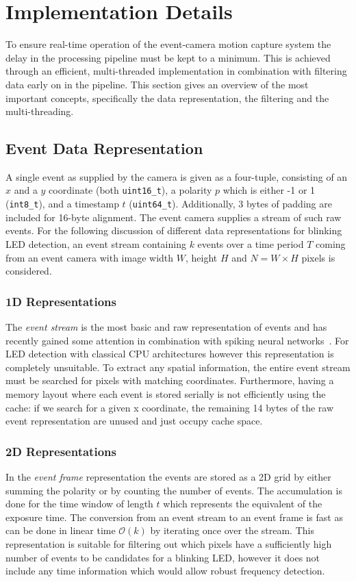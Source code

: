 \section{Implementation Details}
\label{sec:implementation_details}
To ensure real-time operation of the event-camera motion capture system the delay in the processing pipeline must be kept to a minimum. This is achieved through an efficient, multi-threaded implementation in combination with filtering data early on in the pipeline. This section gives an overview of the most important concepts, specifically the data representation, the filtering and the multi-threading.

\subsection{Event Data Representation}
\label{subsec:event_data_representation}
A single event as supplied by the camera is given as a four-tuple, consisting of an $x$ and a $y$ coordinate (both \texttt{uint16\_t}), a polarity $p$ which is either -1 or 1 (\texttt{int8\_t}), and a timestamp $t$ (\texttt{uint64\_t}). Additionally, 3 bytes of padding are included for 16-byte alignment. 
The event camera supplies a stream of such raw events. For the following discussion of different data representations for blinking LED detection, an event stream containing $k$ events over a time period $T$ coming from an event camera with image width $W$, height $H$ and $N = W \times H$ pixels is considered.

\subsubsection*{1D Representations}
The \emph{event stream} is the most basic and raw representation of events and has recently gained some attention in combination with spiking neural networks~\cite{gehrig2020eventbasedangular}. For LED detection with classical CPU architectures however this representation is completely unsuitable. To extract any spatial information, the entire event stream must be searched for pixels with matching coordinates. Furthermore, having a memory layout where each event is stored serially is not efficiently using the cache: if we search for a given x coordinate, the remaining 14 bytes of the raw event representation are unused and just occupy cache space.

\subsubsection*{2D Representations}
In the \emph{event frame} representation the events are stored as a 2D grid by either summing the polarity or by counting the number of events. The accumulation is done for the time window of length $t$ which represents the equivalent of the exposure time. The conversion from an event stream to an event frame is fast as can be done in linear time $\mathcal{O}(k)$ by iterating once over the stream. This representation is suitable for filtering out which pixels have a sufficiently high number of events to be candidates for a blinking LED, however it does not include any time information which would allow robust frequency detection.

